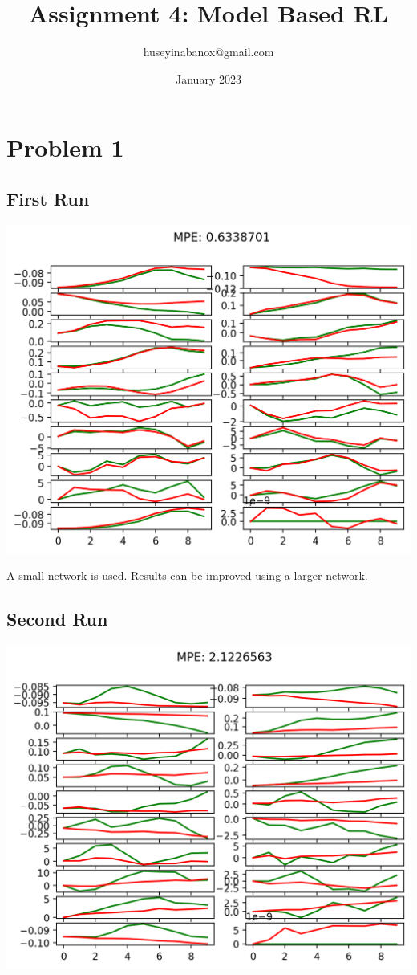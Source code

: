 \documentclass[11pt]{article}
\title{Assignment 4: Model Based RL}
\author{huseyinabanox@gmail.com}
\date{January 2023}
\begin{document}
    \maketitle

    \section*{Problem 1}

    \subsection*{First Run}

    \includegraphics[scale=0.9]{q1/itr_0_predictions_run0}

    A small network is used.
    Results can be improved using a larger network.

    \subsection*{Second Run}

    \includegraphics[scale=0.9]{q1/itr_0_predictions_run1}
\end{document}
